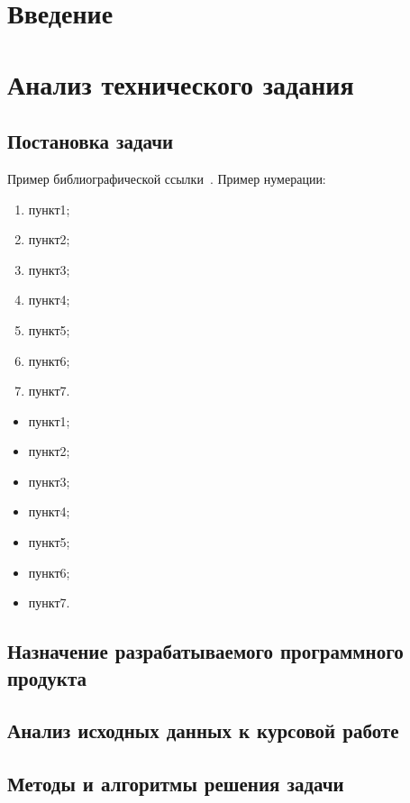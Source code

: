 \section*{Введение}
\lipsum[1-3]
\clearpage



\section{Анализ технического задания}
\subsection{Постановка задачи}
\lipsum[4]

Пример библиографической ссылки~\cite{wiki_main}.
Пример нумерации:
\begin{enumerate}
\item пункт1;
\item пункт2;
\item пункт3;
\item пункт4;
\item пункт5;
\item пункт6;
\item пункт7.
\end{enumerate}

\lipsum[5]
\begin{itemize}
\item пункт1;
\item пункт2;
\item пункт3;
\item пункт4;
\item пункт5;
\item пункт6;
\item пункт7.
\end{itemize}

\subsection{Назначение разрабатываемого программного продукта}
\lipsum[6]

\subsection{Анализ исходных данных к курсовой работе}
\lipsum[7]

\subsection{Методы и алгоритмы решения задачи}
\lipsum[34]

